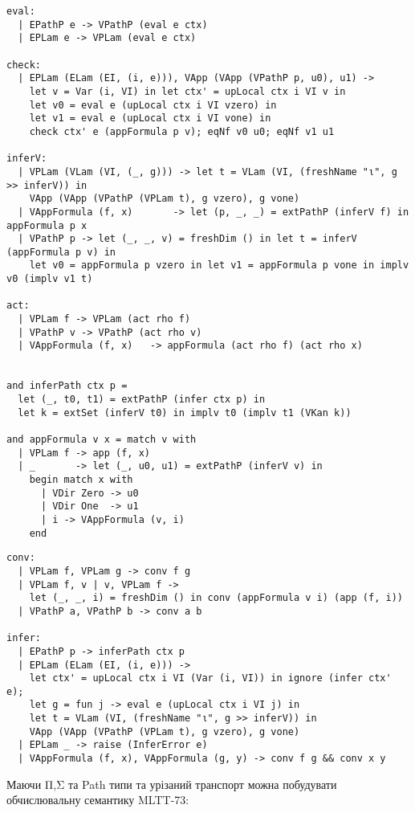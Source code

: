 \begin{lstlisting}[mathescape=true]
eval:
  | EPathP e -> VPathP (eval e ctx)
  | EPLam e -> VPLam (eval e ctx)
  
check:
  | EPLam (ELam (EI, (i, e))), VApp (VApp (VPathP p, u0), u1) ->
    let v = Var (i, VI) in let ctx' = upLocal ctx i VI v in
    let v0 = eval e (upLocal ctx i VI vzero) in
    let v1 = eval e (upLocal ctx i VI vone) in
    check ctx' e (appFormula p v); eqNf v0 u0; eqNf v1 u1

inferV:
  | VPLam (VLam (VI, (_, g))) -> let t = VLam (VI, (freshName "ι", g >> inferV)) in
    VApp (VApp (VPathP (VPLam t), g vzero), g vone)
  | VAppFormula (f, x)       -> let (p, _, _) = extPathP (inferV f) in appFormula p x
  | VPathP p -> let (_, _, v) = freshDim () in let t = inferV (appFormula p v) in
    let v0 = appFormula p vzero in let v1 = appFormula p vone in implv v0 (implv v1 t)

act:
  | VPLam f -> VPLam (act rho f)
  | VPathP v -> VPathP (act rho v)
  | VAppFormula (f, x)   -> appFormula (act rho f) (act rho x)


and inferPath ctx p =
  let (_, t0, t1) = extPathP (infer ctx p) in
  let k = extSet (inferV t0) in implv t0 (implv t1 (VKan k))

and appFormula v x = match v with
  | VPLam f -> app (f, x)
  | _       -> let (_, u0, u1) = extPathP (inferV v) in
    begin match x with
      | VDir Zero -> u0
      | VDir One  -> u1
      | i -> VAppFormula (v, i)
    end
\end{lstlisting}

\newpage
\begin{lstlisting}
conv:
  | VPLam f, VPLam g -> conv f g
  | VPLam f, v | v, VPLam f ->
    let (_, _, i) = freshDim () in conv (appFormula v i) (app (f, i))
  | VPathP a, VPathP b -> conv a b

infer:
  | EPathP p -> inferPath ctx p
  | EPLam (ELam (EI, (i, e))) ->
    let ctx' = upLocal ctx i VI (Var (i, VI)) in ignore (infer ctx' e);
    let g = fun j -> eval e (upLocal ctx i VI j) in
    let t = VLam (VI, (freshName "ι", g >> inferV)) in
    VApp (VApp (VPathP (VPLam t), g vzero), g vone)
  | EPLam _ -> raise (InferError e)
  | VAppFormula (f, x), VAppFormula (g, y) -> conv f g && conv x y

\end{lstlisting}

Маючи Π,Σ та Path типи та урізаний транспорт можна
побудувати обчислювальну семантику MLTT-73:

